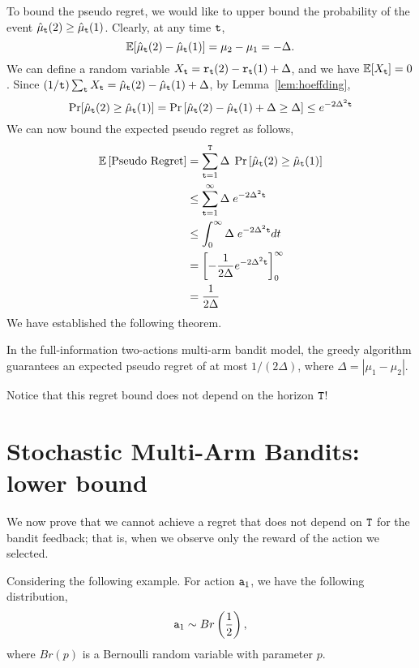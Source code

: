To bound the pseudo regret, we would like  to upper bound the probability of the event $\hat{\mu}_{{\tt t}}(2)\ge \hat{\mu}_{{\tt t}}(1)$. 
Clearly, at any time ${\tt t}$,
\[
\mathbb{E}[\hat{\mu}_{{\tt t}}(2)-\hat{\mu}_{{\tt t}}(1)]=\mu_{2}-\mu_{1}=-\Delta.
\]
We can define a random variable $X_{{\tt t}}={\tt r}_{{\tt t}}(2)-{\tt r}_{{\tt t}}(1)+\Delta$, and we have $\mathbb{E}[X_{{\tt t}}]=0$. Since $(1/{\tt t})\sum_{{\tt t}} X_{{\tt t}} = \hat{\mu}_{{\tt t}}(2)- \hat{\mu}_{{\tt t}}(1)+\Delta$, by
Lemma~\ref{lem:hoeffding},
\[
\Pr[\hat{\mu}_{\tt t}(2)\geq \hat{\mu}_{\tt t}(1)]= \Pr\left[\hat{\mu}_{{\tt t}}(2)-\hat{\mu}_{{\tt t}}(1)+\Delta
\ge\Delta\right]\le e^{-2\Delta^{2}{\tt t}}
\]
We can now bound the expected pseudo regret as follows,
\begin{align*}
\mathbb{E}\left[\text{Pseudo Regret}\right] & = 
 \sum_{{\tt t}=1}^{{\tt T}}\Delta\;\Pr\left[\hat{\mu}_{\tt t}(2)\geq \hat{\mu}_{\tt t}(1)\right]\\
 & \le   \sum_{{\tt t}=1}^{\infty}\Delta \; e^{-2\Delta^{2}{\tt t}}\\
 & \le  \int_{0}^{\infty}\Delta\; e^{-2\Delta^{2}{\tt t}}dt\\
 & =  \left[-\frac{1}{2\Delta}e^{-2\Delta^{2}{\tt t}}\right]_{0}^{\infty}\\
 & =  \frac{1}{2\Delta}
\end{align*}
We have established the following theorem.
\begin{theorem}
In the full-information two-actions multi-arm bandit model, the greedy algorithm guarantees an expected pseudo regret of at most $1/(2\Delta)$, where $\Delta=|\mu_1-\mu_2|$.
\end{theorem}

Notice that this regret bound does not depend on  the horizon ${\tt T}$!

\section{Stochastic Multi-Arm Bandits: lower bound}


We now prove that we cannot achieve a regret that does not depend on ${\tt T}$ for the bandit feedback; that is, when we observe only the reward of the action we selected.

Considering the following example. For action ${\tt a}_1$, we have the following distribution,
\[
{\tt a}_{1}\sim Br\left(\frac{1}{2}\right),\]
where $Br(p)$ is a Bernoulli random variable with parameter $p$.

